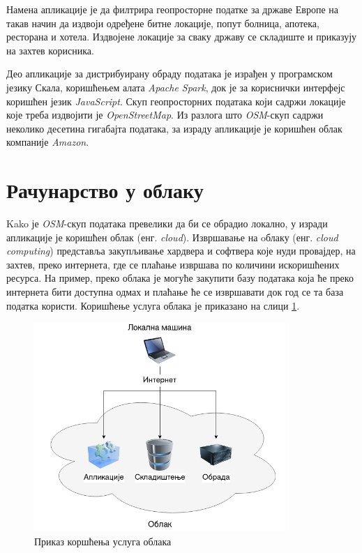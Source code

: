 \documentclass[12pt,oneside]{memoir}
\begin{document}
Намена апликације је да филтрира геопросторне податке за државе Европе на такав начин да издвоји одређене битне локације, попут болница, апотека, ресторана и хотела. Издвојене локације за сваку државу се складиште и приказују на захтев корисника. 

Део апликације за дистрибуирану обраду података је израђен у програмском језику Скала, коришћењем алата \textit{Apache Spark}, док је за кориснички интерфејс коришћен језик \textit{JavaScript}. Скуп геопросторних података који садржи локације које треба издвојити је \textit{OpenStreetMap}. Из разлога што \textit{OSM}-скуп садржи неколико десетина гигабајта података, за израду апликације је коришћен облак компаније \textit{Amazon}.

\section{Рачунарство у облаку}
\label{sec:cloud}

Kako је \textit{OSM}-скуп података превелики да би се обрадио локално, у изради апликације је коришћен облак (енг. \textit{cloud}). Извршавање на oблаку (енг. \textit{cloud computing}) \cite{cloud_computing} представља закупљивање хардвера и софтвера које нуди провајдер, на захтев, преко интернета, где се плаћање извршава по количини искоришћених ресурса. На пример, преко облака је могуће закупити базу података која ће преко интернета бити доступна одмах и плаћање ће се извршавати док год се та база податка користи. Коришћење услуга облака је приказано на слици \ref{fig:cloud_comp_example}.

\begin{figure}[!ht]
  \centering
  \includegraphics[width=0.85\textwidth]{pictures/cloud_computing.png}
  \caption{Приказ коршћења услуга облака}
  \label{fig:cloud_comp_example}
\end{figure}
\end{document}
